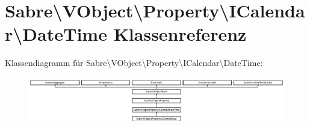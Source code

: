 \hypertarget{class_sabre_1_1_v_object_1_1_property_1_1_i_calendar_1_1_date_time}{}\section{Sabre\textbackslash{}V\+Object\textbackslash{}Property\textbackslash{}I\+Calendar\textbackslash{}Date\+Time Klassenreferenz}
\label{class_sabre_1_1_v_object_1_1_property_1_1_i_calendar_1_1_date_time}
Klassendiagramm für Sabre\textbackslash{}V\+Object\textbackslash{}Property\textbackslash{}I\+Calendar\textbackslash{}Date\+Time\+:\begin{figure}[H]
\begin{center}
\leavevmode
\includegraphics[height=2.058824cm]{class_sabre_1_1_v_object_1_1_property_1_1_i_calendar_1_1_date_time}
\end{center}
\end{figure}
